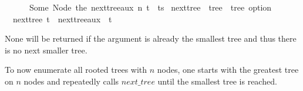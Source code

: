 \begin{isabellebox}
    \ \ \ \ \ \ Some\ {\isacharparenleft}{\kern0pt}Node\ {\isacharparenleft}{\kern0pt}the\ {\isacharparenleft}{\kern0pt}next{\isacharunderscore}{\kern0pt}tree{\isacharunderscore}{\kern0pt}aux\ n\ t{\isacharparenright}{\kern0pt}\ {\isacharhash}{\kern0pt}\ ts{\isacharparenright}{\kern0pt}{\isacharparenright}{\kern0pt}{\isachardoublequoteclose}\isanewline
    \isanewline
    \isamarkupfalse%
    \ next{\isacharunderscore}{\kern0pt}tree\ {\isacharcolon}{\kern0pt}{\isacharcolon}{\kern0pt}\ {\isachardoublequoteopen}tree\ {\isasymRightarrow}\ tree\ option{\isachardoublequoteclose}\ \isanewline
    \ \ {\isachardoublequoteopen}next{\isacharunderscore}{\kern0pt}tree\ t\ {\isacharequal}{\kern0pt}\ next{\isacharunderscore}{\kern0pt}tree{\isacharunderscore}{\kern0pt}aux\ {}\ t{\isachardoublequoteclose}
\end{isabellebox}

None will be returned if the argument is already the smallest tree and thus there is no next smaller tree.

To now enumerate all rooted trees with $n$ nodes,
one starts with the greatest tree on $n$ nodes and repeatedly calls $next\_tree$ until the smallest tree is reached.

